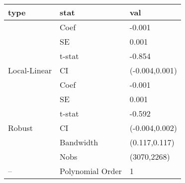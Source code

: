 
\begin{tabular}{lll}
\toprule
type & stat & val\\
\midrule
 & Coef & -0.001\\

 & SE & 0.001\\

 & t-stat & -0.854\\

\multirow{-4}{*}{\raggedright\arraybackslash Local-Linear} & CI & (-0.004,0.001)\\
\cmidrule{1-3}
 & Coef & -0.001\\

 & SE & 0.001\\

 & t-stat & -0.592\\

\multirow{-4}{*}{\raggedright\arraybackslash Robust} & CI & (-0.004,0.002)\\
\cmidrule{1-3}
 & Bandwidth & (0.117,0.117)\\

 & Nobs & (3070,2268)\\

\multirow{-3}{*}{\raggedright\arraybackslash --} & Polynomial Order & 1\\
\bottomrule
\end{tabular}